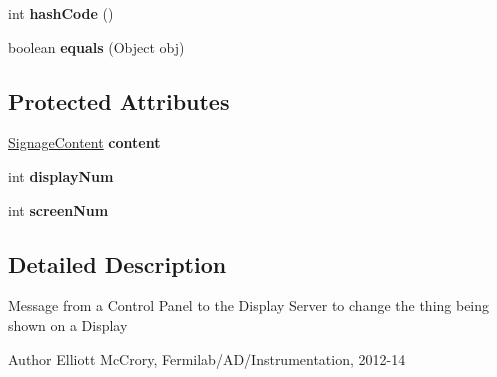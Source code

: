 \begin{DoxyCompactItemize}
\item 
\hypertarget{classgov_1_1fnal_1_1ppd_1_1dd_1_1chat_1_1xml_1_1ChangeChannel_ab841344858b335eeb806ea7970e43076}{int {\bfseries hash\-Code} ()}\label{classgov_1_1fnal_1_1ppd_1_1dd_1_1chat_1_1xml_1_1ChangeChannel_ab841344858b335eeb806ea7970e43076}

\item 
\hypertarget{classgov_1_1fnal_1_1ppd_1_1dd_1_1chat_1_1xml_1_1ChangeChannel_abe7ab9eca57b4523181549426563ce91}{boolean {\bfseries equals} (Object obj)}\label{classgov_1_1fnal_1_1ppd_1_1dd_1_1chat_1_1xml_1_1ChangeChannel_abe7ab9eca57b4523181549426563ce91}

\end{DoxyCompactItemize}
\subsection*{Protected Attributes}
\begin{DoxyCompactItemize}
\item 
\hypertarget{classgov_1_1fnal_1_1ppd_1_1dd_1_1chat_1_1xml_1_1ChangeChannel_aee752fafc6531a896ac497a784529b23}{\hyperlink{interfacegov_1_1fnal_1_1ppd_1_1dd_1_1signage_1_1SignageContent}{Signage\-Content} {\bfseries content}}\label{classgov_1_1fnal_1_1ppd_1_1dd_1_1chat_1_1xml_1_1ChangeChannel_aee752fafc6531a896ac497a784529b23}

\item 
\hypertarget{classgov_1_1fnal_1_1ppd_1_1dd_1_1chat_1_1xml_1_1ChangeChannel_ab11441da247e65a2864dc886c4f5c3c9}{int {\bfseries display\-Num}}\label{classgov_1_1fnal_1_1ppd_1_1dd_1_1chat_1_1xml_1_1ChangeChannel_ab11441da247e65a2864dc886c4f5c3c9}

\item 
\hypertarget{classgov_1_1fnal_1_1ppd_1_1dd_1_1chat_1_1xml_1_1ChangeChannel_a88ae8d5c13ee82db1f1d9035bf15ca0d}{int {\bfseries screen\-Num}}\label{classgov_1_1fnal_1_1ppd_1_1dd_1_1chat_1_1xml_1_1ChangeChannel_a88ae8d5c13ee82db1f1d9035bf15ca0d}

\end{DoxyCompactItemize}


\subsection{Detailed Description}
Message from a Control Panel to the Display Server to change the thing being shown on a Display

\begin{DoxyAuthor}{Author}
Elliott Mc\-Crory, Fermilab/\-A\-D/\-Instrumentation, 2012-\/14 
\end{DoxyAuthor}


